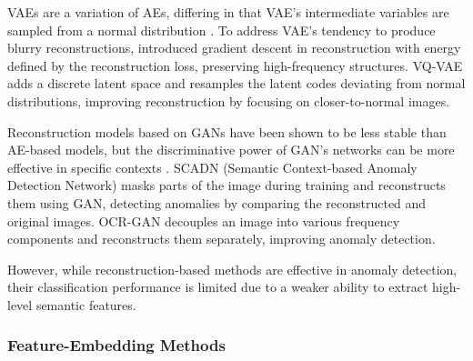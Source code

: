 VAEs are a variation of AEs, differing in that VAE's intermediate variables are sampled from a normal distribution \cite{liu2020towards, dehaene2020iterative}. To address VAE's tendency to produce blurry reconstructions, \cite{dehaene2020iterative} introduced gradient descent in reconstruction with energy defined by the reconstruction loss, preserving high-frequency structures. \DIFdelbegin {}\DIFdelend VQ-VAE \cite{wang2020image} adds a discrete latent space and resamples the latent codes deviating from normal distributions, improving reconstruction by focusing on closer-to-normal images. \DIFdelbegin %

\DIFdelend Reconstruction models based on GANs have been shown to be less stable than AE-based models, but the discriminative power of GAN's networks can be more effective in specific contexts \DIFaddbegin {}\DIFaddend . SCADN (Semantic Context-based Anomaly Detection Network) \cite{yan2021learning} masks parts of the image during training and reconstructs them using GAN, detecting anomalies by comparing the reconstructed and original images. \DIFdelbegin {}\DIFdelend OCR-GAN \cite{liang2023omni} decouples an image into various frequency components and reconstructs them separately, improving anomaly detection.
\DIFaddbegin 



 \DIFaddend However, while reconstruction-based methods are effective in anomaly detection, their classification performance is limited due to a weaker ability to extract high-level semantic features.

\subsubsection*{Feature-Embedding Methods}

